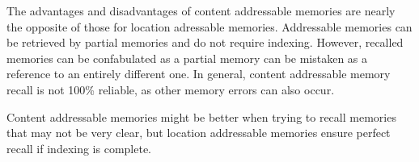 \documentclass[11pt, oneside]{article}
\begin{document}
\begin{enumerate}
  The advantages and disadvantages of content addressable memories are nearly the opposite of those for location adressable memories. Addressable memories can be retrieved by partial memories and do not require indexing. However, recalled memories can be confabulated as a partial memory can be mistaken as a reference to an entirely different one. In general, content addressable memory recall is not 100\% reliable, as other memory errors can also occur.

  Content addressable memories might be better when trying to recall memories that may not be very clear, but location addressable memories ensure perfect recall if indexing is complete.


\end{enumerate}

 \begin{figure}[H]

\end{figure}
\end{document}

